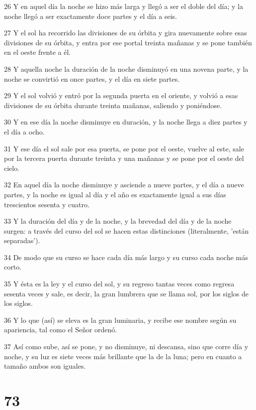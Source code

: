 \par 26 Y en aquel día la noche se hizo más larga y llegó a ser el doble del día; y la noche llegó a ser exactamente doce partes y el día a seis.
\par 27 Y el sol ha recorrido las divisiones de su órbita y gira nuevamente sobre esas divisiones de su órbita, y entra por ese portal treinta mañanas y se pone también en el oeste frente a él.
\par 28 Y aquella noche la duración de la noche disminuyó en una novena parte, y la noche se convirtió en once partes, y el día en siete partes.
\par 29 Y el sol volvió y entró por la segunda puerta en el oriente, y volvió a esas divisiones de su órbita durante treinta mañanas, saliendo y poniéndose.
\par 30 Y en ese día la noche disminuye en duración, y la noche llega a diez partes y el día a ocho.
\par 31 Y ese día el sol sale por esa puerta, se pone por el oeste, vuelve al este, sale por la tercera puerta durante treinta y una mañanas y se pone por el oeste del cielo.
\par 32 En aquel día la noche disminuye y asciende a nueve partes, y el día a nueve partes, y la noche es igual al día y el año es exactamente igual a sus días trescientos sesenta y cuatro.
\par 33 Y la duración del día y de la noche, y la brevedad del día y de la noche surgen: a través del curso del sol se hacen estas distinciones (literalmente, 'están separadas').
\par 34 De modo que su curso se hace cada día más largo y su curso cada noche más corto.
\par 35 Y ésta es la ley y el curso del sol, y su regreso tantas veces como regresa sesenta veces y sale, es decir, la gran lumbrera que se llama sol, por los siglos de los siglos.
\par 36 Y lo que (así) se eleva es la gran luminaria, y recibe ese nombre según su apariencia, tal como el Señor ordenó.
\par 37 Así como sube, así se pone, y no disminuye, ni descansa, sino que corre día y noche, y su luz es siete veces más brillante que la de la luna; pero en cuanto a tamaño ambos son iguales.

\chapter{73}

